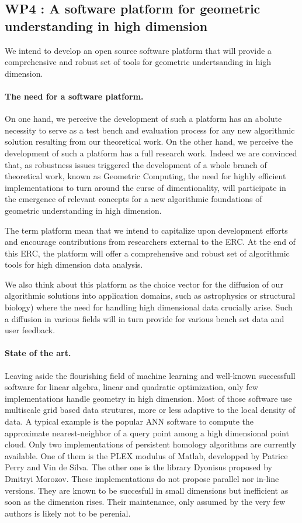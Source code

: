 
\subsection*{WP4 : A software platform for geometric understanding in high
  dimension}

We intend to develop an open source  software platform that will provide a
comprehensive and robust set of tools for geometric undertsanding in
high
dimension. 

\paragraph{ The need for a software platform.}
On one hand, we perceive the development of such a platform has 
an abolute necessity to serve as a test bench and  evaluation process
for any new algorithmic solution resulting  from  our theoretical work.
On the other hand, we perceive the development of such a platform has
a full research work. Indeed we are convinced that, as robustness
issues triggered the development of a whole branch of theoretical
work, known as Geometric Computing, the need for
highly efficient implementations to turn around the curse of  
dimentionality,  will participate in the emergence of relevant
concepts for a new algorithmic foundations
of  geometric understanding in high dimension.


The term platform mean that we intend to capitalize
upon development efforts and encourage contributions
from researchers external to the ERC.
 At the end of this ERC,
the platform will offer 
a comprehensive and robust set of algorithmic tools
for high dimension data analysis.

We also think about this platform as the choice
vector for the diffusion of our algorithmic solutions 
into application domains, such as astrophysics
or structural biology) 
 where the need for handling high dimensional
data crucially arise.  Such a diffusion in various fields
 will in turn provide for various bench set data 
and user feedback.



\paragraph{ State of the art.}  
Leaving aside the flourishing field of machine learning
and well-known successfull software for linear algebra,
linear and quadratic optimization,  only  few implementations handle
geometry in high dimension. 
Most of those software use multiscale  grid based
data strutures,  more or less adaptive
 to the local  density of data.
A typical example is the popular ANN software to compute  the approximate
nearest-neighbor of a query point
among a  high dimensional point cloud. 
Only two implementations of persistent homology algorithms are
currently available. One of them is the PLEX modulus of Matlab,
developped by Patrice Perry and Vin de Silva. The other one is the
library Dyonisus proposed by Dmitryi Morozov. These implementations
do not propose parallel nor in-line versions. They are known to be
succesfull in small dimensions but inefficient as soon as the
dimension rises.  Their  maintenance, only assumed by the very few authors
is likely not to be perenial.


